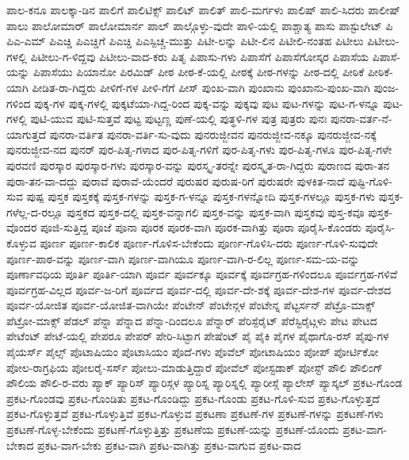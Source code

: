 {ಪಾಲ-ಕನೂ
ಪಾಲಕ್ಕಾ-ಡಿನ
ಪಾಲಿಗೆ
ಪಾಲಿಟಿಕ್ಸ್
ಪಾಲಿಟ್
ಪಾಲಿತ್
ಪಾಲಿ-ಮರ್ಗಳು
ಪಾಲಿಷ್
ಪಾಲಿ-ಸಿದರು
ಪಾಲೀಷ್
ಪಾಲು
ಪಾಲೋಮಾರ್
ಪಾಲೋಮಾರ್ನ
ಪಾಲ್
ಪಾಲ್ಗೊಳ್ಳು-ವುದೇ
ಪಾಳಿ-ಯಲ್ಲಿ
ಪಾಶ್ಚಾತ್ಯ
ಪಾಸು
ಪಾಸ್ಟುಲೇಟ್
ಪಿ
ಪಿಎ-ಎಮ್
ಪಿಎಚ್ಡಿ
ಪಿಎಚ್ಡಿಗೆ
ಪಿಎಚ್ಡಿ
ಪಿಎಸ್ಪಿಚ್ಚ-ಮುತ್ತು
ಪಿಟೀ-ಲನ್ನು
ಪಿಟೀ-ಲಿನ
ಪಿಟೀಲಿ-ನಂತಹ
ಪಿಟೀಲು
ಪಿಟೀಲು-ಗಳಲ್ಲಿ
ಪಿಟೀಲು-ಗ-ಳಿದ್ದವು
ಪಿಟೀಲು-ವಾದ-ಕರು
ಪಿತೃ
ಪಿಪಾಸು-ಗಳು
ಪಿಪಾಸೆಗೆ
ಪಿಪಾಸೆಗೋಸ್ಕರ
ಪಿಪಾಸೆಯ
ಪಿಪಾಸೆ-ಯನ್ನು
ಪಿಪಾಸೆಯು
ಪಿಯಾನೋ
ಪಿರಮಿಡ್
ಪೀಠ
ಪೀಠ-ಕೆ-ಯಲ್ಲಿ
ಪೀಠಕ್ಕೆ
ಪೀಠ-ಗಳನ್ನು
ಪೀಠ-ದಲ್ಲಿ
ಪೀಠಿಕೆ
ಪೀಠಿಕೆ-ಯಾಗಿ
ಪೀಡಿತ-ರಾ-ಗಿದ್ದರು
ಪೀಳಿಗೆ-ಗಳ
ಪೀಳಿ-ಗೆಗೆ
ಪೀಸ್
ಪುಂಖ-ವಾಗಿ
ಪುಂಖಾನು
ಪುಂಖಾನು-ಪುಂಖ-ವಾಗಿ
ಪುಂಜ-ಗಳಿಂದ
ಪುಕ್ಕ-ಗಳ
ಪುಕ್ಕ-ಗಳಲ್ಲಿ
ಪುಕ್ಕಟೆಯಾ-ಗಿದ್ದ-ರಿಂದ
ಪುಕ್ಕ-ವನ್ನು
ಪುಕ್ಕವು
ಪುಟ
ಪುಟ-ಗಳನ್ನು
ಪುಟ-ಗ-ಳನ್ನೂ
ಪುಟ-ಗಳಲ್ಲಿ
ಪುಟಿ-ಯುವ
ಪುಟಿ-ಸುತ್ತವೆ
ಪುಟ್ಟ
ಪುಟ್ಟಣ್ಣ
ಪುಣೆ-ಯಲ್ಲಿ
ಪುತ್ಥಳಿ-ಗಳ
ಪುತ್ರ
ಪುತ್ರರು
ಪುನಃ
ಪುನರಾ-ವರ್ತ-ನೆ-ಯಾಗುತ್ತದೆ
ಪುನರಾ-ವರ್ತಿತ
ಪುನರಾ-ವರ್ತಿ-ಸು-ವುದು
ಪುನರುಜ್ಜೀವನ
ಪುನರುಜ್ಜೀವ-ನಕ್ಕೂ
ಪುನರುಜ್ಜೀವ-ನಕ್ಕೆ
ಪುನರುಜ್ಜೀವ-ನದ
ಪುನರ್
ಪುರ-ಪಿತೃ-ಗಳಾದ
ಪುರ-ಪಿತೃ-ಗಳಿಗೆ
ಪುರ-ಪಿತೃ-ಗಳು
ಪುರ-ಪಿತೃ-ಗಳೂ
ಪುರ-ಪಿತೃ-ಗಳೇ
ಪುರವಣಿ
ಪುರಸ್ಕಾರ
ಪುರಸ್ಕಾರ-ಗಳು
ಪುರಸ್ಕಾರ-ವನ್ನು
ಪುರಸ್ಕೃ-ತರನ್ನೇ
ಪುರಸ್ಕೃತ-ರಾ-ಗಿದ್ದರು
ಪುರಾಣದ
ಪುರಾ-ತನ
ಪುರಾ-ತನ-ವಾ-ದದ್ದು
ಪುರಾವೆ
ಪುರಾವೆ-ಯೆಂದರೆ
ಪುರುಷರ
ಪುರುಷ-ರಿಗೆ
ಪುರುಷರೇ
ಪುಳಕಿತ-ನಾದೆ
ಪುಷ್ಟಿ-ಗೊಳಿ-ಸುವ
ಪುಷ್ಪ
ಪುಸ್ತಕ
ಪುಸ್ತಕಕ್ಕೆ
ಪುಸ್ತಕ-ಗಳನ್ನು
ಪುಸ್ತಕ-ಗ-ಳನ್ನೂ
ಪುಸ್ತಕ-ಗಳನ್ನೋದಿ
ಪುಸ್ತಕ-ಗಳಲ್ಲೂ
ಪುಸ್ತಕ-ಗಳು
ಪುಸ್ತಕ-ಗಳೆಲ್ಲ-ದ-ರಲ್ಲೂ
ಪುಸ್ತಕದ
ಪುಸ್ತಕ-ದಲ್ಲಿ
ಪುಸ್ತಕ-ವನ್ನಾಗಲಿ
ಪುಸ್ತಕ-ವನ್ನು
ಪುಸ್ತಕ-ವಾಗಿ
ಪುಸ್ತಕವು
ಪುಸ್ತ-ಕವೂ
ಪುಸ್ತಕ-ವೊಂದರ
ಪೂಜಿ-ಸುತ್ತಿದ್ದ
ಪೂಜೆ
ಪೂನಾ
ಪೂರಕ
ಪೂರಕ-ವಾಗಿ
ಪೂರಕ-ವಾಗಿತ್ತು
ಪೂರಾ
ಪೂರೈಸಿ-ಕೊಂಡರು
ಪೂರೈಸಿ-ಕೊಳ್ಳುವ
ಪೂರ್ಣ
ಪೂರ್ಣ-ಕಾಲಿಕ
ಪೂರ್ಣ-ಗೊಳಿಸ-ಬೇಕೆಂದು
ಪೂರ್ಣ-ಗೊಳಿಸಿ-ದರು
ಪೂರ್ಣ-ಗೊಳಿ-ಸುವುದೇ
ಪೂರ್ಣ-ಪಾಠ-ವನ್ನು
ಪೂರ್ಣ-ವಾಗಿ
ಪೂರ್ಣ-ವಾಗಿಯೂ
ಪೂರ್ಣ-ವಾಗಿ-ರ-ಲಿಲ್ಲ
ಪೂರ್ಣ-ಸಮ-ಯ-ವನ್ನು
ಪೂರ್ಣಾವಧಿಯ
ಪೂರ್ತಿ
ಪೂರ್ತಿ-ಯಾಗಿ
ಪೂರ್ವ
ಪೂರ್ವಕ್ಕೂ
ಪೂರ್ವಕ್ಕೆ
ಪೂರ್ವಗ್ರಹ-ಗಳಿಂದಲೂ
ಪೂರ್ವಗ್ರಹ-ಗಳಿವೆ
ಪೂರ್ವಗ್ರಹ-ವಿಲ್ಲದ
ಪೂರ್ವ-ಜ-ರಿಗೆ
ಪೂರ್ವದ
ಪೂರ್ವ-ದಲ್ಲಿ
ಪೂರ್ವ-ದೇ-ಶಕ್ಕೆ
ಪೂರ್ವ-ದೇಶ-ಗಳ
ಪೂರ್ವ-ದೇಶದ
ಪೂರ್ವ-ಯೋಜಿತ
ಪೂರ್ವ-ಯೋಜಿತ-ವಾಗಿಯೇ
ಪೆಂಟೇನ್
ಪೆಂಟೇನ್ಗಳ
ಪೆಂಟೇನ್ನ
ಪೆಟ್ಟರ್ಸನ್
ಪೆಟ್ರೊ-ಮಾಕ್ಸ್
ಪೆಟ್ರೋ-ಮಾಕ್ಸ್
ಪೆಡಲ್
ಪೆನ್ನಾ
ಪೆನ್ನಾದ
ಪೆನ್ನಾ-ದಿಂದಲೂ
ಪೆನ್ನಾರ್
ಪೆರಿಸ್ಪೆರೈಟ್
ಪೆರೆಸ್ಟಿರೈಟ್ಗಳು
ಪೇಟ
ಪೇಟದ
ಪೇಟೆಂಟ್
ಪೇಟೆ-ಯಲ್ಲಿ
ಪೇಪರೂ
ಪೇಪರ್
ಪೇರಿ-ಸಿಟ್ಟಾಗ
ಪೇಷೆಂಟ್
ಪೈ
ಪೈಕಿ
ಪೈಗಳ
ಪೈಥಾಗೊ-ರಸ್
ಪೈಪು-ಗಳ
ಪೈಯರ್ಸ್
ಪೈಲ್ಸ್
ಪೊಟಾಷಿಯಂ
ಪೊಟಾಸಿಯಂ
ಪೊದೆ-ಗಳು
ಪೊವೆಲ್
ಪೋಟಾಷಿಯಂ
ಪೋಪ್
ಪೋರ್ಟಿಕೋ
ಪೋಲ-ರಾಗ್ರಫಿಯ
ಪೋಲರೈ-ಸರ್ಸ್
ಪೋಲು-ಮಾಡುತ್ತಿದ್ದಾರೆ
ಪೋವೆಲ್
ಪೋಸ್ಟಡಾಕ್
ಪೋಸ್ಟ್
ಪೌಲಿ
ಪೌಲಿಂಗ್
ಪೌಲಿಯ
ಪೌಲಿ-ರ-ವರು
ಪ್ಯಾಕ್
ಪ್ಯಾರಿಸ್
ಪ್ಯಾರಿಸ್ಗಳ
ಪ್ಯಾರಿಸ್ನ
ಪ್ಯಾರಿಸ್ನಲ್ಲಿ
ಪ್ಯಾರೀಸ್ಗೆ
ಪ್ಯಾಲೇಸ್
ಪ್ಯಾಸ್ಕಲ್
ಪ್ರಕಟ-ಗೊಂಡ
ಪ್ರಕಟ-ಗೊಂಡವು
ಪ್ರಕಟ-ಗೊಂಡಿತು
ಪ್ರಕಟ-ಗೊಂಡಿದ್ದು
ಪ್ರಕಟ-ಗೊಂಡು
ಪ್ರಕಟ-ಗೊಳಿ-ಸುವ
ಪ್ರಕಟ-ಗೊಳ್ಳುತ್ತದೆ
ಪ್ರಕಟ-ಗೊಳ್ಳುತ್ತವೆ
ಪ್ರಕಟ-ಗೊಳ್ಳುತ್ತಿವೆ
ಪ್ರಕಟ-ಗೊಳ್ಳುವ
ಪ್ರಕಟಣಾ
ಪ್ರಕಟಣೆ-ಗಳ
ಪ್ರಕಟಣೆ-ಗಳನ್ನು
ಪ್ರಕಟಣೆ-ಗಳು
ಪ್ರಕಟಣೆ-ಗೊಳ್ಳ-ಬೇಕೆಂದು
ಪ್ರಕಟಣೆ-ಗೊಳ್ಳುತ್ತಿತ್ತು
ಪ್ರಕಟಣೆಯ
ಪ್ರಕಟಣೆ-ಯನ್ನು
ಪ್ರಕಟಣೆ-ಯೊಂದು
ಪ್ರಕಟ-ವಾಗ-ಬೇಕಾದ
ಪ್ರಕಟ-ವಾಗ-ಬೇಕು
ಪ್ರಕಟ-ವಾಗಿ
ಪ್ರಕಟ-ವಾಗಿತ್ತು
ಪ್ರಕಟ-ವಾಗುವ
ಪ್ರಕಟ-ವಾದ
}
